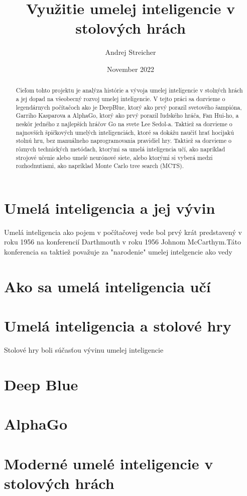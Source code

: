 \documentclass[12pt, a4paper]{article}
\begin{document}
\title{Využitie umelej inteligencie v stolových hrách}
\author{Andrej Streicher}
\date{November 2022}
\maketitle
\begin{abstract}
Cieľom tohto projektu je analýza histórie a vývoja umelej inteligencie v stolných hrách a jej dopad na všeobecný rozvoj umelej inteligencie. 
V tejto práci sa dozvieme o legendárnych počítačoch ako je DeepBlue, ktorý ako prvý porazil svetového šampióna, Garriho Kasparova a AlphaGo, ktorý ako prvý porazil ľudského hráča, Fan Hui-ho, a neskôr jedného z najlepších hráčov Go na svete Lee Sedol-a. Taktiež sa dozvieme o najnovších špičkových umelých inteligenciách, ktoré sa dokážu naučiť hrať hocijakú stolnú hru, bez manuálneho naprogramovania pravidiel hry.  
Taktiež sa dozvieme o rôznych technických metódach, ktorými sa umelá inteligencia učí, ako napríklad strojové učenie alebo umelé neurónové siete, alebo ktorými si vyberá medzi rozhodnutiami, ako napríklad Monte Carlo tree search (MCTS).
\end{abstract}
\section{Umelá inteligencia a jej vývin}
Umelá inteligencia ako pojem v počítačovej vede bol prvý krát predstavený v roku 1956 na konferencií Darthmouth v roku 1956 Johnom McCarthym.\cite{Corduck}Táto konferencia sa taktiež považuje za "narodenie" umelej intelgencie ako vedy
\section{Ako sa umelá inteligencia učí}
\section{Umelá inteligencia a stolové hry}
Stolové hry boli súčasťou vývinu umelej inteligencie 
\section{Deep Blue}
\section{AlphaGo}
\section{Moderné umelé inteligencie v stolových hrách}
{}

\end{document}
